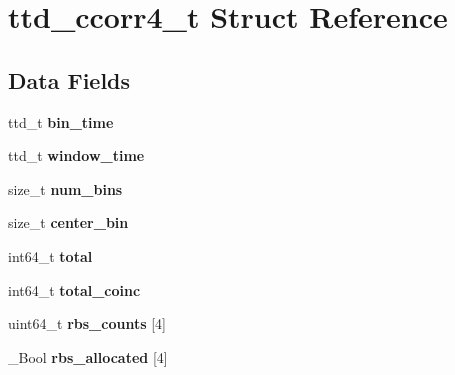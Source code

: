 \hypertarget{structttd__ccorr4__t}{}\section{ttd\+\_\+ccorr4\+\_\+t Struct Reference}
\label{structttd__ccorr4__t}
\subsection*{Data Fields}
\begin{DoxyCompactItemize}
\item 
\hypertarget{structttd__ccorr4__t_aa45984bd71b410822eb4963fd5f6bc22}{}ttd\+\_\+t {\bfseries bin\+\_\+time}\label{structttd__ccorr4__t_aa45984bd71b410822eb4963fd5f6bc22}

\item 
\hypertarget{structttd__ccorr4__t_ad7e321cafe8a31f0456280e765551a58}{}ttd\+\_\+t {\bfseries window\+\_\+time}\label{structttd__ccorr4__t_ad7e321cafe8a31f0456280e765551a58}

\item 
\hypertarget{structttd__ccorr4__t_a6afe1df41b42ab4257da65c27f6ecd7d}{}size\+\_\+t {\bfseries num\+\_\+bins}\label{structttd__ccorr4__t_a6afe1df41b42ab4257da65c27f6ecd7d}

\item 
\hypertarget{structttd__ccorr4__t_a002ea5a0718396307671f816ef705863}{}size\+\_\+t {\bfseries center\+\_\+bin}\label{structttd__ccorr4__t_a002ea5a0718396307671f816ef705863}

\item 
\hypertarget{structttd__ccorr4__t_aa4ac207111b26294ea3edcfaa9389e06}{}int64\+\_\+t {\bfseries total}\label{structttd__ccorr4__t_aa4ac207111b26294ea3edcfaa9389e06}

\item 
\hypertarget{structttd__ccorr4__t_aebba61259ee8397b240a66cce4440fcd}{}int64\+\_\+t {\bfseries total\+\_\+coinc}\label{structttd__ccorr4__t_aebba61259ee8397b240a66cce4440fcd}

\item 
\hypertarget{structttd__ccorr4__t_acc248298766e5c2e692b422b4384e643}{}uint64\+\_\+t {\bfseries rbs\+\_\+counts} \mbox{[}4\mbox{]}\label{structttd__ccorr4__t_acc248298766e5c2e692b422b4384e643}

\item 
\hypertarget{structttd__ccorr4__t_a1fb03da90c42ee32b17b7ba3ac0c5477}{}\+\_\+\+Bool {\bfseries rbs\+\_\+allocated} \mbox{[}4\mbox{]}\label{structttd__ccorr4__t_a1fb03da90c42ee32b17b7ba3ac0c5477}


\end{DoxyCompactItemize}
